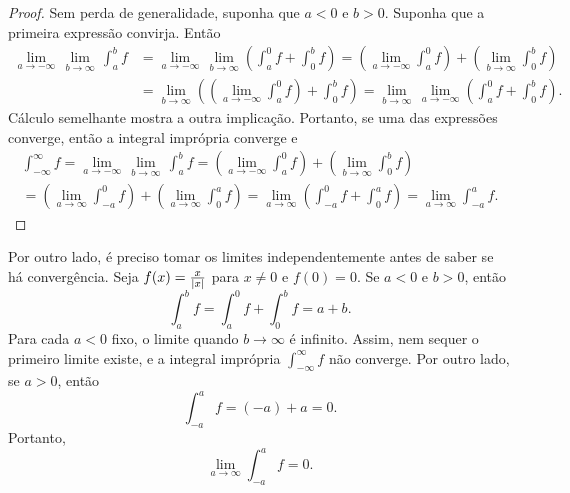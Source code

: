 \begin{proof}
Sem perda de generalidade, suponha que $a < 0$ e $b > 0$. Suponha
que a primeira expressão convirja. Então
\begin{equation*}
\begin{split}
\lim_{a \to -\infty} \, \lim_{b \to \infty} \, \int_a^b f
& =
\lim_{a \to -\infty} \, \lim_{b \to \infty}
\left(
\int_a^0 f
+
\int_0^b f
\right)
=
\left(
\lim_{a \to -\infty}
\int_a^0 f
\right)
+
\left(
 \lim_{b \to \infty}
\int_0^b f
\right) \\
& = 
 \lim_{b \to \infty}
\left(
\left(
\lim_{a \to -\infty}
\int_a^0 f
\right) 
+
\int_0^b f
\right)
=
 \lim_{b \to \infty} \,
\lim_{a \to -\infty}
\left(
\int_a^0 f
+
\int_0^b f
\right)  .
\end{split}
\end{equation*}
Cálculo semelhante mostra a outra implicação. Portanto, se
uma das expressões converge, então a integral imprópria converge
e
\begin{multline*}
\int_{-\infty}^\infty f
=
\lim_{a \to -\infty} \, \lim_{b \to \infty} \, \int_a^b f
=
\left(
\lim_{a \to -\infty}
\int_a^0 f
\right)
+
\left(
 \lim_{b \to \infty}
\int_0^b f
\right)
\\
=
\left(
\lim_{a \to \infty}
\int_{-a}^0 f
\right)
+
\left(
 \lim_{a \to \infty}
\int_0^a f
\right)
=
\lim_{a \to \infty}
\left(
\int_{-a}^0 f
+
\int_0^a f
\right)
=
\lim_{a \to \infty}
\int_{-a}^a f .
\end{multline*}
\end{proof}

\begin{example}
Por outro lado, é preciso tomar os limites independentemente antes de saber
se há convergência. Seja
$f(x) = \frac{x}{\lvert {x} \rvert}$ para $x \neq 0$ e $f(0) = 0$.
Se $a < 0$ e $b > 0$, então
\begin{equation*}
\int_{a}^b f
=
\int_{a}^0 f
+
\int_{0}^b f
=
a+b .
\end{equation*}
Para cada $a < 0$ fixo, o limite quando $b \to \infty$ é infinito.
Assim, nem sequer o primeiro limite existe,
e a integral imprópria $\int_{-\infty}^\infty f$ não converge.
Por outro lado, se $a > 0$, então
\begin{equation*}
\int_{-a}^{a} f
=
(-a)+a = 0 .
\end{equation*}
Portanto,
\begin{equation*}
\lim_{a\to\infty}
\int_{-a}^{a} f
= 0 .
\end{equation*}
\end{example}

